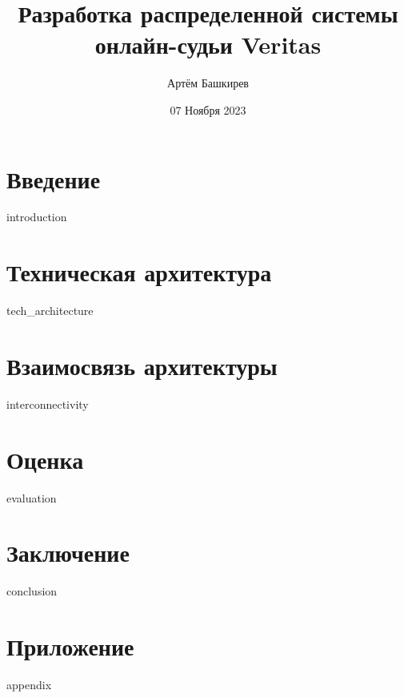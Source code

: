 \documentclass[12pt]{article}
\title{Разработка распределенной системы онлайн-судьи Veritas}
\author{Артём Башкирев}
\date{07 Ноября 2023}
\begin{document}
\maketitle

\newpage
    \tableofcontents
\newpage

\newpage
    \section{Введение}
    {introduction}
\newpage
    \section{Техническая архитектура}
    {tech_architecture}
\newpage
    \section{Взаимосвязь архитектуры}
    {interconnectivity}
\newpage
    \section{Оценка}
    {evaluation}
\newpage
    \section{Заключение}
    {conclusion}
\newpage
    \section{Приложение}
    {appendix}
\newpage
\end{document}
